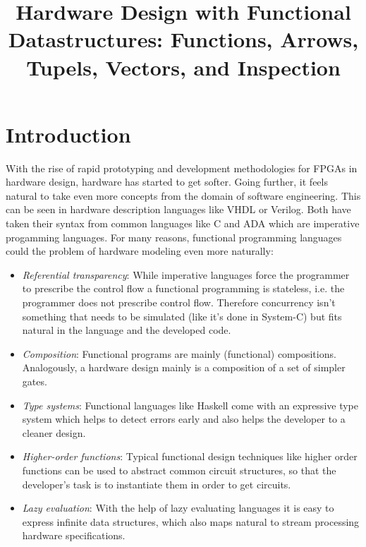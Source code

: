 \documentclass[11pt,final,a4paper]{article}
\title{Hardware Design with Functional Datastructures: Functions, Arrows, Tupels, Vectors, and Inspection}
\begin{document}
\section{Introduction}


\label{introduction}
With the rise of rapid prototyping and development methodologies for FPGAs in hardware design, hardware has started to get softer. 
Going further, it feels natural to take even more concepts from the domain of software engineering. This can be seen in
hardware description languages like VHDL or Verilog. Both have taken their syntax from common languages like C and ADA which are
imperative progamming languages. For many reasons, functional programming languages could the problem of hardware modeling even
more naturally: 
\begin{itemize}
  \item \emph{Referential transparency}: While imperative languages force the programmer to prescribe the control flow a
  functional programming is stateless, i.e. the programmer does not prescribe control flow. Therefore concurrency isn't something
  that needs to be simulated (like it's done in System-C) but fits natural in the language and the developed code.
  \item \emph{Composition}: Functional programs are mainly (functional) compositions. Analogously, a hardware design mainly is a
  composition of a set of simpler gates. 
  \item \emph{Type systems}: Functional languages like Haskell come with an expressive type system which helps to detect errors early and
    also helps the developer to a cleaner design.
  \item \emph{Higher-order functions}: Typical functional design techniques like higher order functions can be used to abstract common
    circuit structures, so that the developer's task is to instantiate them in order to get circuits. 
  \item \emph{Lazy evaluation}: With the help of lazy evaluating languages it is easy to express infinite data structures, which also maps
    natural to stream processing hardware specifications. 
\end{itemize}
\end{document}
